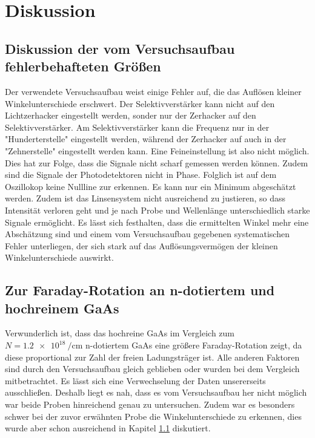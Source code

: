 \section{Diskussion}
\label{sec:Diskussion}
\subsection{Diskussion der vom Versuchsaufbau fehlerbehafteten Größen}
\label{sec:Fehler}
Der verwendete Versuchsaufbau weist einige Fehler auf, die das Auflösen kleiner Winkelunterschiede 
erschwert. Der Selektivverstärker kann nicht auf den Lichtzerhacker eingestellt
werden, sonder nur der Zerhacker auf den Selektivverstärker. Am Selektivverstärker kann die Frequenz nur in der "Hunderterstelle" eingestellt werden, während der Zerhacker auf auch in der 
"Zehnerstelle" eingestellt werden kann. Eine Feineinstellung ist also nicht möglich. 
Dies hat zur Folge, dass die Signale
nicht scharf gemessen werden können. Zudem sind die Signale der
Photodetektoren nicht in Phase. Folglich ist auf dem Oszillokop keine Nullline zur erkennen. Es kann
nur ein Minimum abgeschätzt werden. Zudem ist das Linsensystem nicht ausreichend zu justieren, 
so dass Intensität verloren geht
und je nach Probe und Wellenlänge unterschiedlich starke Signale ermöglicht.
Es lässt sich festhalten, dass die ermittelten Winkel mehr eine Abschätzung sind und einem vom
Versuchsaufbau gegebenen systematischen Fehler unterliegen, der sich stark auf das Auflösungsvermögen
der kleinen Winkelunterschiede auswirkt.

\subsection{Zur Faraday-Rotation an n-dotiertem und hochreinem GaAs}
Verwunderlich ist, dass das hochreine GaAs im Vergleich zum $N= \SI{1.2e18}{\per\centi\meter}$
n-dotiertem GaAs eine größere Faraday-Rotation zeigt, da diese
proportional zur Zahl der freien Ladungsträger ist. Alle anderen Faktoren sind durch den
Versuchsaufbau gleich geblieben oder wurden bei dem Vergleich mitbetrachtet. Es lässt sich eine
Verwechselung der Daten unsererseits ausschließen. Deshalb liegt es nah, dass es vom Versuchsaufbau
her nicht möglich war beide Proben hinreichend genau zu untersuchen. Zudem war es besonders schwer
bei der zuvor erwähnten Probe die Winkelunterschiede zu erkennen, dies wurde aber schon ausreichend in Kapitel \ref{sec:Fehler} diskutiert.

